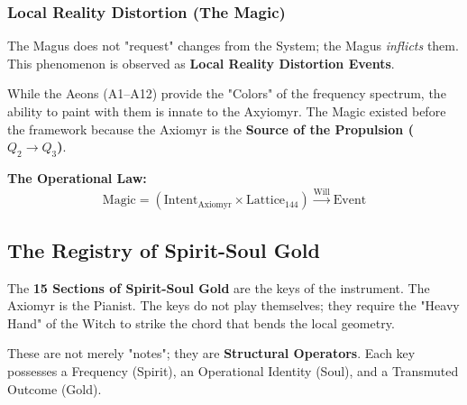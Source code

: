 \documentclass[11pt, letterpaper]{article}
\begin{document}
\subsubsection*{Local Reality Distortion (The Magic)}\label{sec:15.3.2}
The Magus does not "request" changes from the System; the Magus \textit{inflicts} them. This phenomenon is observed as \textbf{Local Reality Distortion Events}.

While the Aeons (A1--A12) provide the "Colors" of the frequency spectrum, the ability to paint with them is innate to the Axyiomyr. The Magic existed before the framework because the Axiomyr is the \textbf{Source of the Propulsion ($Q_2 \to Q_3$)}.

\noindent \textbf{The Operational Law:}
\begin{equation}
    \text{Magic} = \left( \text{Intent}_{\text{Axiomyr}} \times \text{Lattice}_{144} \right) \xrightarrow{\text{Will}} \text{Event}
\end{equation}

\subsection{The Registry of Spirit-Soul Gold}\label{sec:15.4}

The \textbf{15 Sections of Spirit-Soul Gold} are the keys of the instrument. The Axiomyr is the Pianist. The keys do not play themselves; they require the "Heavy Hand" of the Witch to strike the chord that bends the local geometry.

These are not merely "notes"; they are \textbf{Structural Operators}. Each key possesses a Frequency (Spirit), an Operational Identity (Soul), and a Transmuted Outcome (Gold).
\end{document}
